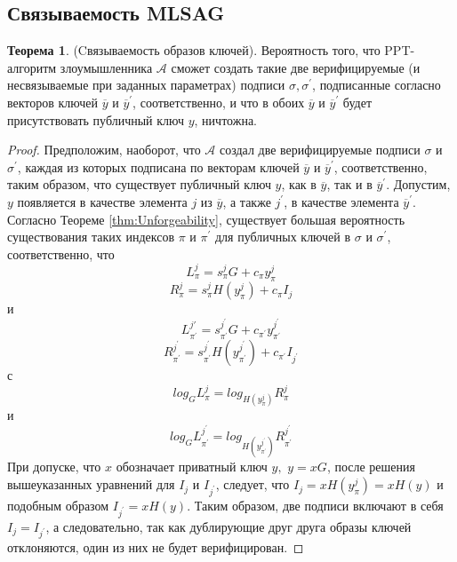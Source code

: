 \documentclass{mrl}
\theoremstyle{definition}
\newtheorem{thm}{Теорема}
\numberwithin{thm}{section}
\begin{document}
\subsection{Связываемость MLSAG}
\begin{thm}
(Cвязываемость образов ключей). Вероятность того, что PPT-алгоритм злоумышленника $\mathcal{A}$ сможет создать такие две верифицируемые (и несвязываемые при заданных параметрах) подписи $\sigma,\sigma^{\prime}$, подписанные согласно векторов ключей $\overline{y}$ и $\overline{y}^{\prime}$, соответственно, и что в обоих $\overline{y}$ и $\overline{y}^{\prime}$ будет присутствовать публичный ключ $y$, ничтожна. \end{thm}
\begin{proof}
Предположим, наоборот, что $\mathcal{A}$ создал две верифицируемые подписи $\sigma$ и $\sigma^{\prime}$, каждая из которых подписана по векторам ключей $\overline{y}$ и $\overline{y}^{\prime}$, соответственно, таким образом, что существует публичный ключ $y$, как в $\overline{y}$, так и в $\overline{y}^{\prime}.$
Допустим, $y$ появляется в качестве элемента $j$ из $\overline{y}$, а также $j^{\prime}$, в качестве элемента $\overline{y}^{\prime}.$ Согласно Теореме \ref{thm:Unforgeability}, существует большая вероятность существования таких индексов $\pi$ и $\pi^{\prime}$ для публичных ключей в $\sigma$ и $\sigma^{\prime}$, соответственно, что
\[
L_{\pi}^{j}=s_{\pi}^{j}G+c_{\pi}y_{\pi}^{j}
\]
\[
R_{\pi}^{j}=s_{\pi}^{j}H\left(y_{\pi}^{j}\right)+c_{\pi}I_{j}
\]
и
\[
L_{\pi^{\prime}}^{j\prime}=s_{\pi^{\prime}}^{j^{\prime}}G+c_{\pi^{\prime}}y_{\pi^{\prime}}^{j^{\prime}}
\]
\[
R_{\pi^{\prime}}^{j^{\prime}}=s_{\pi^{\prime}}^{j^{\prime}}H\left(y_{\pi^{\prime}}^{j^{\prime}}\right)+c_{\pi^{\prime}}I_{j^{\prime}}
\]
с
\[
log_{G}L_{\pi}^{j}=log_{H\left(y_{\pi}^{j}\right)}R_{\pi}^{j}
\]
и
\[
log_{G}L_{\pi^{\prime}}^{j^{\prime}}=log_{H\left(y_{\pi^{\prime}}^{j^{\prime}}\right)}R_{\pi^{\prime}}^{j^{\prime}}
\]
При допуске, что $x$ обозначает приватный ключ $y,$ $y=xG$, после решения вышеуказанных уравнений для $I_{j}$ и $I_{j^{\prime}}$, следует, что $I_{j}=xH\left(y_{\pi}^{j}\right)=xH\left(y\right)$ и подобным образом $I_{j^{\prime}}=xH\left(y\right).$ Таким образом, две подписи включают в себя $I_{j}=I_{j^{\prime}}$, а следовательно, так как дублирующие друг друга образы ключей отклоняются, один из них не будет верифицирован.
\end{proof}
\end{document}
